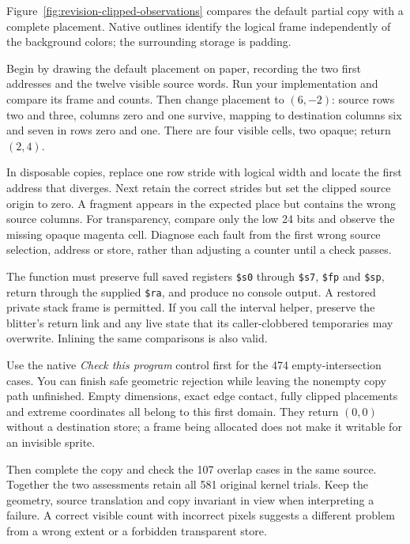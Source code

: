 Figure~\ref{fig:revision-clipped-observations} compares the default partial copy
with a complete placement. Native outlines identify the logical frame independently
of the background colors; the surrounding storage is padding.



Begin by drawing the default placement on paper, recording the two first addresses
and the twelve visible source words. Run your implementation and compare its
frame and counts. Then change placement to $(6,-2)$: source rows two and three,
columns zero and one survive, mapping to destination columns six and seven in
rows zero and one. There are four visible cells, two opaque; return $(2,4)$.

In disposable copies, replace one row stride with logical width and locate the
first address that diverges. Next retain the correct strides but set the clipped
source origin to zero. A fragment appears in the expected place but contains the
wrong source columns. For transparency, compare only the low 24 bits and observe
the missing opaque magenta cell. Diagnose each fault from the first wrong source
selection, address or store, rather than adjusting a counter until a check passes.

The function must preserve full saved registers \texttt{\$s0} through
\texttt{\$s7}, \texttt{\$fp} and \texttt{\$sp}, return through the supplied
\texttt{\$ra}, and produce no console output. A restored private stack frame is
permitted. If you call the interval helper, preserve the blitter's return link and
any live state that its caller-clobbered temporaries may overwrite. Inlining the
same comparisons is also valid.

Use the native \emph{Check this program} control first for the 474
empty-intersection cases. You can finish safe geometric rejection while leaving
the nonempty copy path unfinished. Empty dimensions, exact edge contact,
fully clipped placements and extreme coordinates all belong to this first domain.
They return $(0,0)$ without a destination store; a frame being allocated does not
make it writable for an invisible sprite.

Then complete the copy and check the 107 overlap cases in the same source. Together
the two assessments retain all 581 original kernel trials. Keep the geometry,
source translation and copy invariant in view when interpreting a failure. A
correct visible count with incorrect pixels suggests a different problem from a
wrong extent or a forbidden transparent store.

